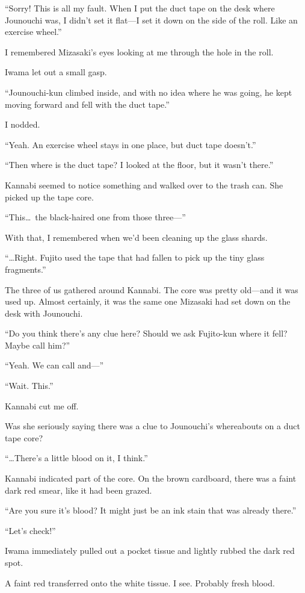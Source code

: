 \documentclass[
    a4paper,
    12pt,
    twoside,
    openany,
    UTF8,
    fontset=windows
]{ctexbook}
\begin{document}
``Sorry! This is all my fault. When I put the duct tape on the desk where Jounouchi was, I didn't set it flat---I set it down on the side of the roll. Like an exercise wheel.''

I remembered Mizasaki's eyes looking at me through the hole in the roll.

Iwama let out a small gasp.

``Jounouchi-kun climbed inside, and with no idea where he was going, he kept moving forward and fell with the duct tape.''

I nodded.

``Yeah. An exercise wheel stays in one place, but duct tape doesn't.''

``Then where is the duct tape? I looked at the floor, but it wasn't there.''

Kannabi seemed to notice something and walked over to the trash can. She picked up the tape core.

``This\dots\ the black-haired one from those three---''

With that, I remembered when we'd been cleaning up the glass shards.

``\dots Right. Fujito used the tape that had fallen to pick up the tiny glass fragments.''

The three of us gathered around Kannabi. The core was pretty old---and it was used up. Almost certainly, it was the same one Mizasaki had set down on the desk with Jounouchi.

``Do you think there's any clue here? Should we ask Fujito-kun where it fell? Maybe call him?''

``Yeah. We can call and---''

``Wait. This.''

Kannabi cut me off.

Was she seriously saying there was a clue to Jounouchi's whereabouts on a duct tape core?

``\dots There's a little blood on it, I think.''

Kannabi indicated part of the core. On the brown cardboard, there was a faint dark red smear, like it had been grazed.

``Are you sure it's blood? It might just be an ink stain that was already there.''

``Let's check!''

Iwama immediately pulled out a pocket tissue and lightly rubbed the dark red spot.

A faint red transferred onto the white tissue. I see. Probably fresh blood.
\end{document}
